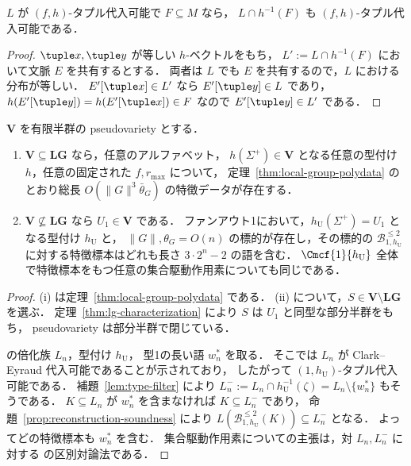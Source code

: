 \begin{lemma}[型フィルタは代入可能性を保つ]
\label{lem:type-filter}
$L$ が $(f,h)$-タプル代入可能で $F\subseteq M$ なら，
$L\cap h^{-1}(F)$ も $(f,h)$-タプル代入可能である．
\end{lemma}

\begin{proof}
$\tuple x,\tuple y$ が等しい $h$-ベクトルをもち，
$L':=L\cap h^{-1}(F)$ において文脈 $E$ を共有するとする．
両者は $L$ でも $E$ を共有するので，$L$ における分布が等しい．
$E'[\tuple x]\in L'$ なら $E'[\tuple y]\in L$ であり，
$h(E'[\tuple y])=h(E'[\tuple x])\in F$ なので $E'[\tuple y]\in L'$ である．
\end{proof}

\begin{corollary}
\label{cor:pseudovariety-dichotomy}
$\mathbf V$ を有限半群の pseudovariety とする．
\begin{enumerate}[label=\textup{(\roman*)},leftmargin=*]
\item $\mathbf V\subseteq\mathbf{LG}$ なら，任意のアルファベット，
$h(\Sigma^+)\in\mathbf V$ となる任意の型付け $h$，任意の固定された $f,r_{\max}$ について，
定理~\ref{thm:local-group-polydata} のとおり総長 $O(\|G\|^3\bar\theta_G)$ の特徴データが存在する．
\item $\mathbf V\not\subseteq\mathbf{LG}$ なら $U_1\in\mathbf V$ である．
ファンアウト1において，$h_{\mathrm U}(\Sigma^+)=U_1$ となる型付け $h_{\mathrm U}$ と，
$\|G\|,\theta_G=O(n)$ の標的が存在し，その標的の
$\mathcal B^{\le2}_{1,h_{\mathrm U}}$ に対する特徴標本はどれも長さ $3\cdot2^n-2$ の語を含む．
$\Cmcf{1}{h_{\mathrm U}}$ 全体で特徴標本をもつ任意の集合駆動作用素についても同じである．
\end{enumerate}
\end{corollary}

\begin{proof}
(i) は定理~\ref{thm:local-group-polydata} である．
(ii) について，$S\in\mathbf V\setminus\mathbf{LG}$ を選ぶ．
定理~\ref{thm:lg-characterization} により $S$ は $U_1$ と同型な部分半群をもち，
pseudovariety は部分半群で閉じている．

\cite[Proposition~6.3]{kuriyamaCFG} の倍化族 $L_n$，型付け $h_{\mathrm U}$，
型1の長い語 $w_n^*$ を取る．
そこでは $L_n$ が Clark--Eyraud 代入可能であることが示されており，
したがって $(1,h_{\mathrm U})$-タプル代入可能である．
補題~\ref{lem:type-filter} により
$L_n^-:=L_n\cap h_{\mathrm U}^{-1}(\zeta)=L_n\setminus\{w_n^*\}$ もそうである．
$K\subseteq L_n$ が $w_n^*$ を含まなければ $K\subseteq L_n^-$ であり，
命題~\ref{prop:reconstruction-soundness} により
$L(\mathcal B^{\le2}_{1,h_{\mathrm U}}(K))\subseteq L_n^-$ となる．
よってどの特徴標本も $w_n^*$ を含む．
集合駆動作用素についての主張は，対 $L_n,L_n^-$ に対する
\cite[Proposition~6.3(iv)]{kuriyamaCFG} の区別対論法である．
\end{proof}

